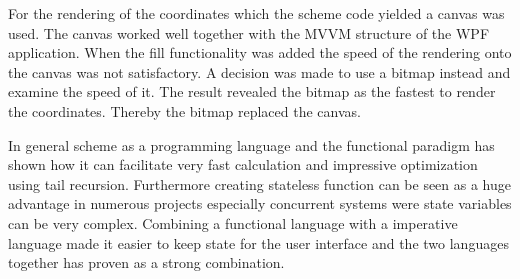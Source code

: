 For the rendering of the coordinates which the scheme code yielded a canvas was used. The canvas worked well together with the MVVM structure of the WPF application. When the fill functionality was added the speed of the rendering onto the canvas was not satisfactory. A decision was made to use a bitmap instead and examine the speed of it. The result revealed the bitmap as the fastest to render the coordinates. Thereby the bitmap replaced the canvas. 

In general scheme as a programming language and the functional paradigm has shown how it can facilitate very fast calculation and impressive optimization using tail recursion. Furthermore creating stateless function can be seen as a huge advantage in numerous projects especially concurrent systems were state variables can be very complex. Combining a functional language with a imperative language made it easier to keep state for the user interface and the two languages together has proven as a strong combination.